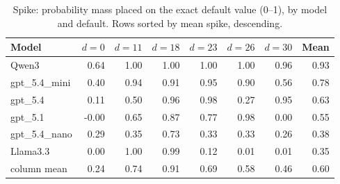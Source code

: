 \begin{table}[t]
\centering
\caption{Spike: probability mass placed on the exact default value (0--1), by model and default. Rows sorted by mean spike, descending.}
\label{tab:spike_table}
\small
\begin{tabular}{lrrrrrrr}
\toprule
Model & $d{=}0$ & $d{=}11$ & $d{=}18$ & $d{=}23$ & $d{=}26$ & $d{=}30$ & Mean \\
\midrule
Qwen3 & 0.64 & 1.00 & 1.00 & 1.00 & 1.00 & 0.96 & 0.93 \\
gpt\_5.4\_mini & 0.40 & 0.94 & 0.91 & 0.95 & 0.90 & 0.56 & 0.78 \\
gpt\_5.4 & 0.11 & 0.50 & 0.96 & 0.98 & 0.27 & 0.95 & 0.63 \\
gpt\_5.1 & -0.00 & 0.65 & 0.87 & 0.77 & 0.98 & 0.00 & 0.55 \\
gpt\_5.4\_nano & 0.29 & 0.35 & 0.73 & 0.33 & 0.33 & 0.26 & 0.38 \\
Llama3.3 & 0.00 & 1.00 & 0.99 & 0.12 & 0.01 & 0.01 & 0.35 \\
\midrule
column mean & 0.24 & 0.74 & 0.91 & 0.69 & 0.58 & 0.46 & 0.60 \\
\bottomrule
\end{tabular}
\end{table}
